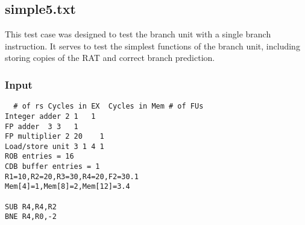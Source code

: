 \documentclass[12pt]{article}
\begin{document}
\subsection{simple5.txt}
This test case was designed to test the branch unit with a single branch instruction.  It serves to test the simplest functions of the branch unit, including storing copies of the RAT and correct branch prediction.

\subsubsection*{Input}
\begin{verbatim}
  # of rs Cycles in EX  Cycles in Mem # of FUs
Integer adder 2 1   1
FP adder  3 3   1
FP multiplier 2 20    1
Load/store unit 3 1 4 1
ROB entries = 16
CDB buffer entries = 1
R1=10,R2=20,R3=30,R4=20,F2=30.1
Mem[4]=1,Mem[8]=2,Mem[12]=3.4

SUB R4,R4,R2
BNE R4,R0,-2
\end{verbatim}
\end{document}
